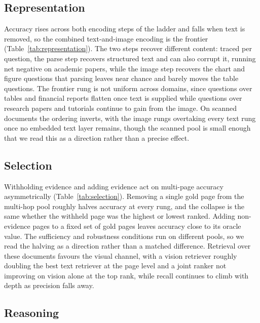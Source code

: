 \documentclass[11pt]{article}
\begin{document}
\subsection{Representation}
\label{subsec:res_representation}

Accuracy rises across both encoding steps of the ladder and falls when text is removed, so the combined text-and-image encoding is the frontier (Table~\ref{tab:representation}). The two steps recover different content: traced per question, the parse step recovers structured text and can also corrupt it, running net negative on academic papers, while the image step recovers the chart and figure questions that parsing leaves near chance and barely moves the table questions. The frontier rung is not uniform across domains, since questions over tables and financial reports flatten once text is supplied while questions over research papers and tutorials continue to gain from the image. On scanned documents the ordering inverts, with the image rungs overtaking every text rung once no embedded text layer remains, though the scanned pool is small enough that we read this as a direction rather than a precise effect.

\subsection{Selection}
\label{subsec:res_selection}

Withholding evidence and adding evidence act on multi-page accuracy asymmetrically (Table~\ref{tab:selection}). Removing a single gold page from the multi-hop pool roughly halves accuracy at every rung, and the collapse is the same whether the withheld page was the highest or lowest ranked. Adding non-evidence pages to a fixed set of gold pages leaves accuracy close to its oracle value. The sufficiency and robustness conditions run on different pools, so we read the halving as a direction rather than a matched difference. Retrieval over these documents favours the visual channel, with a vision retriever roughly doubling the best text retriever at the page level and a joint ranker not improving on vision alone at the top rank, while recall continues to climb with depth as precision falls away.

\subsection{Reasoning}
\label{subsec:res_reasoning}
\end{document}
